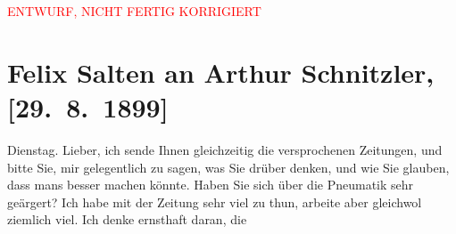 
\begin{center}
            \textcolor{red}{ENTWURF, NICHT FERTIG KORRIGIERT}
                      \end{center}
            
         
         \renewcommand{\erwaehntePersonen}{Personen: Hugo von Hofmannsthal}
         \renewcommand{\erwaehnteInstitutionen}{Institutionen: Wiener Allgemeine Zeitung, Wiener Verlag}
         \renewcommand{\erwaehnteOrte}{Orte: Wien}
         \renewcommand{\erwaehnteWerke}{Werke: Begräbnis, Das Manhard-Zimmer, Der Hinterbliebene, Der Hinterbliebene. Kurze Novellen, Fernen, Flucht, Heldentod. Novelle, Lebenszeit, Sedan}
               \section[Felix Salten an Arthur Schnitzler, {[}29. 8. 1899{]}]{ Felix Salten an Arthur Schnitzler, {[}29. 8. 1899{]}}\nopagebreak{}\rehead{ }\begin{ledgroupsized}[t]{13cm}\normalsize\beginnumbering \toendnotes[C]{\smallbreak\pagebreak[2]} 
\toendnotes[C]{\smallbreak}\pstart
           \raggedleft{}{\pb}Dienstag. \pend
           \pstart
           Lieber, ich sende Ihnen gleichzeitig die versprochenen Zeitungen,
               und bitte Sie, mir gelegentlich zu sagen, was Sie drüber denken, und wie Sie glauben,
               dass mans besser machen könnte. Haben Sie sich über die Pneumatik sehr geärgert? Ich
               habe mit der Zeitung sehr viel
               zu thun, arbeite aber gleichwol ziemlich viel. Ich denke ernsthaft daran, die \label{K_L03299-1v}
\end{ledgroupsized}
